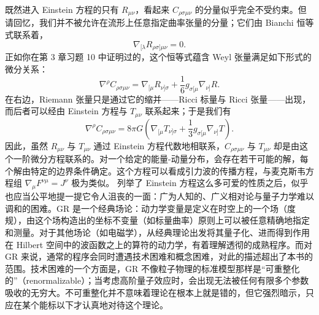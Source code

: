 既然进入 Einstein 方程的只有 $R_{\mu\nu}$，看起来 $C_{\rho\sigma\mu\nu}$ 的分量似乎完全不受约束。但请回忆，我们并不被允许在流形上任意指定曲率张量的分量；它们由 Bianchi 恒等式联系着，
\begin{equation*}
\nabla_{[\lambda}R_{\rho\sigma]\mu\nu} = 0.
\tag{4.88}
\end{equation*}
正如你在第 3 章习题 10 中证明过的，这个恒等式蕴含 Weyl 张量满足如下形式的微分关系：
\begin{equation*}
\nabla^\rho C_{\rho\sigma\mu\nu} = \nabla_{[\mu}R_{\nu]\sigma} + \frac{1}{6}g_{\sigma[\mu}\nabla_{\nu]}R.
\tag{4.89}
\end{equation*}
在右边，Riemann 张量只是通过它的缩并——Ricci 标量与 Ricci 张量——出现，而后者可以经由 Einstein 方程与 $T_{\mu\nu}$ 联系起来；于是我们有
\begin{equation*}
\nabla^\rho C_{\rho\sigma\mu\nu} = 8\pi G\left(\nabla_{[\mu}T_{\nu]\sigma} + \frac{1}{3}g_{\sigma[\mu}\nabla_{\nu]}T\right).
\tag{4.90}
\end{equation*}
因此，虽然 $R_{\mu\nu}$ 与 $T_{\mu\nu}$ 通过 Einstein 方程代数地相联系，$C_{\rho\sigma\mu\nu}$ 与 $T_{\mu\nu}$ 却是由这个一阶微分方程联系的。对一个给定的能量-动量分布，会存在若干可能的解，每个解由特定的边界条件确定。这个方程可以看成引力波的传播方程，与麦克斯韦方程组 $\nabla_\mu F^{\nu\mu}=J^\nu$ 极为类似。
列举了 Einstein 方程这么多可爱的性质之后，似乎也应当公平地提一提它令人沮丧的一面：广为人知的、广义相对论与量子力学难以调和的困难。GR 是一个经典场论：动力学变量是定义在时空上的一个场（度规），由这个场构造出的坐标不变量（如标量曲率）原则上可以被任意精确地指定和测量。对于其他场论（如电磁学），从经典理论出发将其量子化、进而得到作用在 Hilbert 空间中的波函数之上的算符的动力学，有着理解透彻的成熟程序。而对 GR 来说，通常的程序会同时遭遇技术困难和概念困难，对此的描述超出了本书的范围。技术困难的一个方面是，GR 不像粒子物理的标准模型那样是“可重整化的”（renormalizable）；当考虑高阶量子效应时，会出现无法被任何有限多个参数吸收的无穷大。不可重整化并不意味着理论在根本上就是错的，但它强烈暗示，只应在某个能标以下才认真地对待这个理论。

